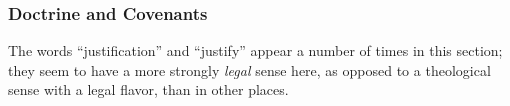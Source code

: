 		
		
	\subsubsection{Doctrine and Covenants} %
		\label{JUSTIFICATION-DC}
	
		
		\begin{compactdesc}
			\item[{\hyperref[DC98]{DC 98}}] The words ``justification'' and ``justify'' appear a number of times in this section; they seem to have a more strongly \textit{legal} sense here, as opposed to a theological sense with a legal flavor, than in other places.
		\end{compactdesc}
		
	
		
		

	
